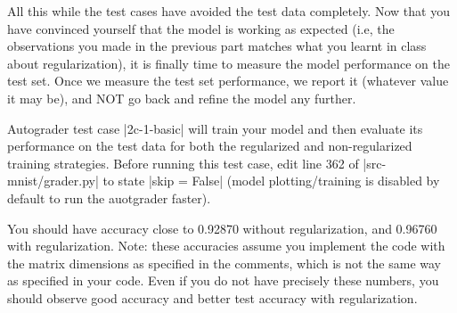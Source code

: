 \item {}
All this while the test cases have avoided the test data completely. Now that
you have convinced yourself that the model is working as expected (i.e, the
observations you made in the previous part matches what you learnt in class
about regularization), it is finally time to measure the model performance on
the test set. Once we measure the test set performance, we report it (whatever
value it may be), and NOT go back and refine the model any further.

Autograder test case |2c-1-basic| will train your model and then evaluate its performance on the test data for both the regularized and non-regularized training strategies.  Before running this test case, edit line 362 of |src-mnist/grader.py| to state |skip = False| (model plotting/training is disabled by default to run the auotgrader faster).

You should have accuracy close to 0.92870 without regularization, and 0.96760 with regularization.
Note: these accuracies assume you implement the code with the matrix dimensions as specified in
the comments, which is not the same way as specified in your code. Even if you do not have precisely these
numbers, you should observe good accuracy and better test accuracy with regularization.

